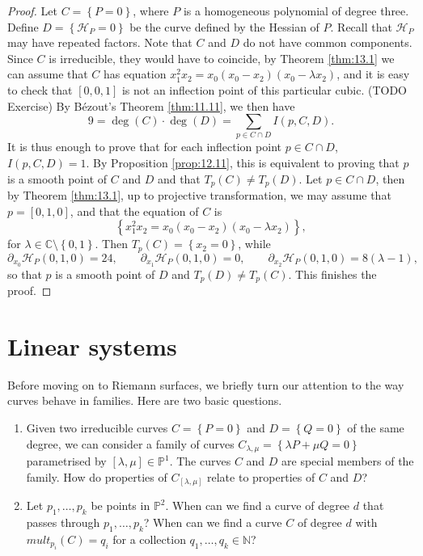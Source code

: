 \documentclass{article}
\newcommand{\N}{\mathbb{N}}
\newcommand{\C}{\mathbb{C}}
\renewcommand{\P}{\mathbb{P}}
\newcommand{\rb}[1]{\left( #1 \right)}
\renewcommand{\sb}[1]{\left[ #1 \right]}
\newcommand{\cb}[1]{\left\{ #1 \right\}}
\theoremstyle{definition}\newtheorem{definition}{Definition}[section]
\theoremstyle{definition}\newtheorem{notation}[definition]{Notation}
\theoremstyle{definition}\newtheorem{remark}[definition]{Remark}
\theoremstyle{definition}\newtheorem{example}[definition]{Example}
\theoremstyle{definition}\newtheorem{fact}{Fact}
\theoremstyle{definition}\newtheorem{exercise}{Exercise}
\begin{document}
\begin{proof}
Let $ C = \cb{P = 0} $, where $ P $ is a homogeneous polynomial of degree three. Define $ D = \cb{\mathcal{H}_P = 0} $ be the curve defined by the Hessian of $ P $. Recall that $ \mathcal{H}_P $ may have repeated factors. Note that $ C $ and $ D $ do not have common components. Since $ C $ is irreducible, they would have to coincide, by Theorem \ref{thm:13.1} we can assume that $ C $ has equation $ x_1^2x_2 = x_0\rb{x_0 - x_2}\rb{x_0 - \lambda x_2} $, and it is easy to check that $ \sb{0, 0, 1} $ is not an inflection point of this particular cubic. (TODO Exercise) By Bézout's Theorem \ref{thm:11.11}, we then have
$$ 9 = \deg\rb{C} \cdot \deg\rb{D} = \sum_{p \in C \cap D} I\rb{p, C, D}. $$
It is thus enough to prove that for each inflection point $ p \in C \cap D $, $ I\rb{p, C, D} = 1 $. By Proposition \ref{prop:12.11}, this is equivalent to proving that $ p $ is a smooth point of $ C $ and $ D $ and that $ T_p\rb{C} \ne T_p\rb{D} $. Let $ p \in C \cap D $, then by Theorem \ref{thm:13.1}, up to projective transformation, we may assume that $ p = \sb{0, 1, 0} $, and that the equation of $ C $ is
$$ \cb{x_1^2x_2 = x_0\rb{x_0 - x_2}\rb{x_0 - \lambda x_2}}, $$
for $ \lambda \in \C \setminus \cb{0, 1} $. Then $ T_p\rb{C} = \cb{x_2 = 0} $, while
$$ \partial_{x_0}\mathcal{H}_P\rb{0, 1, 0} = 24, \qquad \partial_{x_1}\mathcal{H}_P\rb{0, 1, 0} = 0, \qquad \partial_{x_2}\mathcal{H}_P\rb{0, 1, 0} = 8\rb{\lambda - 1}, $$
so that $ p $ is a smooth point of $ D $ and $ T_p\rb{D} \ne T_p\rb{C} $. This finishes the proof.
\end{proof}

\section{Linear systems}

Before moving on to Riemann surfaces, we briefly turn our attention to the way curves behave in families. Here are two basic questions.
\begin{enumerate}
\item Given two irreducible curves $ C = \cb{P = 0} $ and $ D = \cb{Q = 0} $ of the same degree, we can consider a family of curves $ C_{\lambda, \mu} = \cb{\lambda P + \mu Q = 0} $ parametrised by $ \sb{\lambda, \mu} \in \P^1 $. The curves $ C $ and $ D $ are special members of the family. How do properties of $ C_{\sb{\lambda, \mu}} $ relate to properties of $ C $ and $ D $?
\item Let $ p_1, \dots, p_k $ be points in $ \P^2 $. When can we find a curve of degree $ d $ that passes through $ p_1, \dots, p_k $? When can we find a curve $ C $ of degree $ d $ with $ mult_{p_i}\rb{C} = q_i $ for a collection $ q_1, \dots, q_k \in \N $?
\end{enumerate}
\end{document}
